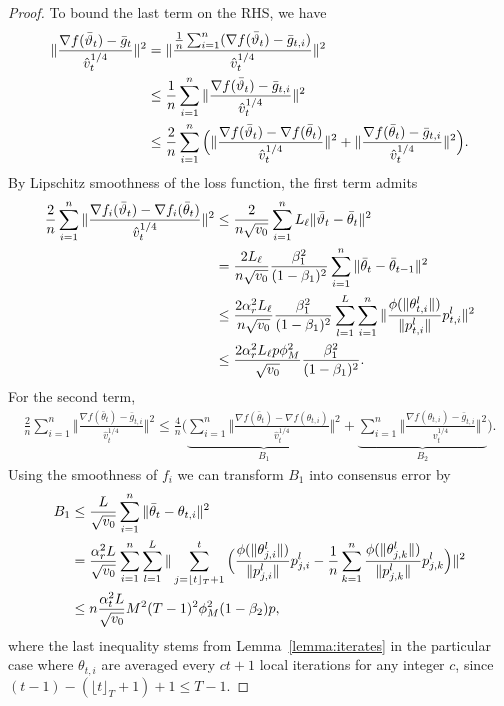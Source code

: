 \documentclass[manuscript,screen,review]{acmart}
\begin{document}
\begin{proof}
\newpage

To bound the last term on the RHS, we have
\begin{align}\notag
    \Vert \frac{\nabla f(\bar\vartheta_t)-\bar g_t }{\hat v_t^{1/4}}\Vert^2&=\Vert \frac{\frac{1}{n}\sum_{i=1}^n (\nabla f(\bar\vartheta_t)-\bar g_{t,i})}{\hat v_t^{1/4}} \Vert^2\\\notag
    &\leq \frac{1}{n}\sum_{i=1}^n\Vert \frac{\nabla f(\bar\vartheta_t)-\bar g_{t,i}}{\hat v_t^{1/4}} \Vert^2\\\notag
    &\leq \frac{2}{n}\sum_{i=1}^n \Big(\Vert \frac{\nabla f(\bar\vartheta_t)-\nabla f(\bar\theta_t)}{\hat v_t^{1/4}} \Vert^2+\Vert \frac{\nabla f(\bar\theta_t)-\bar g_{t,i}}{\hat v_t^{1/4}} \Vert^2  \Big). 
\end{align}
By Lipschitz smoothness of the loss function, the first term admits
\begin{align}\notag
    \frac{2}{n}\sum_{i=1}^n\Vert \frac{\nabla f_i(\bar\vartheta_t)-\nabla f_i(\bar\theta_t)}{\hat v_t^{1/4}} \Vert^2&\leq \frac{2}{n \sqrt{v_0}}\sum_{i=1}^n L_\ell\Vert \bar\vartheta_t-\bar\theta_t\Vert^2  \\\notag
    &=\frac{2L_\ell}{n \sqrt{v_0}}\frac{\beta_1^2}{(1-\beta_1)^2}\sum_{i=1}^n \Vert \bar\theta_t-\bar\theta_{t-1}\Vert ^2\\\notag
    &\leq \frac{2\alpha_r^2 L_\ell }{n \sqrt{v_0}}\frac{\beta_1^2}{(1-\beta_1)^2} \sum_{l=1}^L \sum_{i=1}^n\Vert \frac{\phi(\Vert \theta_{t,i}^l\Vert)}{\Vert p_{t,i}^l\Vert}p_{t,i}^l \Vert^2\\\notag
    &\leq \frac{2\alpha_r^2 L_\ell p\phi_M^2}{ \sqrt{v_0}}\frac{\beta_1^2}{(1-\beta_1)^2}.
\end{align}
For the second term,
\begin{align}\label{eq:inter}
    \frac{2}{n}\sum_{i=1}^n\Vert \frac{\nabla f(\bar\theta_t)-\bar g_{t,i}}{\hat v_t^{1/4}} \Vert^2 \leq \frac{4}{n}\Big( \underbrace{\sum_{i=1}^n \Vert \frac{\nabla f(\bar\theta_t)-\nabla f(\theta_{t,i})}{\hat v_t^{1/4}} \Vert^2}_{B_1} + \underbrace{ \sum_{i=1}^n\Vert \frac{\nabla f(\theta_{t,i})-\bar g_{t,i}}{\hat v_t^{1/4}} \Vert^2}_{B_2} \Big).
\end{align}
Using the smoothness of $f_i$ we can transform $B_1$ into consensus error by
\begin{align}\notag
    B_1&\leq \frac{L}{\sqrt{v_0}}\sum_{i=1}^n \Vert \bar\theta_t - \theta_{t,i}\Vert^2  \label{eqn:B1}\\
    &=\frac{\alpha_r^2 L}{\sqrt{v_0}}\sum_{i=1}^n\sum_{l=1}^L \| \sum_{j=\lfloor t \rfloor_T+1}^t \Big( \frac{\phi(\Vert \theta_{j,i}^l\Vert)}{\Vert p_{j,i}^l\Vert}p_{j,i}^l-\frac{1}{n}\sum_{k=1}^n \frac{\phi(\Vert \theta_{j,k}^l\Vert)}{\Vert p_{j,k}^l\Vert}p_{j,k}^l \Big) \|^2\\\notag
    &\leq n \frac{\alpha_t^2 L}{\sqrt{v_0}} M^2 (T-1)^2 \phi_M^2 (1-\beta_2)p,
\end{align}
where the last inequality stems from Lemma~\ref{lemma:iterates} in the particular case where $  \theta_{t,i}$ are averaged every $ct+1$ local iterations for any integer $c$, since $(t-1)-(\lfloor t \rfloor_T+1)+1 \leq T-1$.



\end{proof}
\end{document}
